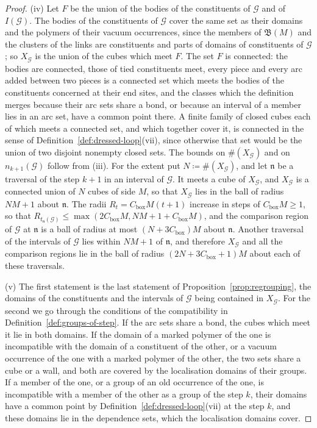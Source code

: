 \documentclass[11pt]{preprint}
\numberwithin{equation}{section}
\theoremstyle{definition}
\theoremstyle{remark}
\theoremstyle{plain}
\begin{document}
\begin{proof}
(iv) Let $F$ be the union of the bodies of the constituents of $\mathcal G$ and of $I(\mathcal G)$. The bodies of the constituents of $\mathcal G$ cover the same set as their domains and the polymers of their vacuum occurrences, since the members of $\mathfrak B(M)$ and the clusters of the links are constituents and parts of domains of constituents of $\mathcal G$; so $X_{\mathcal G}$ is the union of the cubes which meet $F$. The set $F$ is connected: the bodies are connected, those of tied constituents meet, every piece and every arc added between two pieces is a connected set which meets the bodies of the constituents concerned at their end sites, and the classes which the definition merges because their arc sets share a bond, or because an interval of a member lies in an arc set, have a common point there. A finite family of closed cubes each of which meets a connected set, and which together cover it, is connected in the sense of Definition~\ref{def:dressed-loop}(vii), since otherwise that set would be the union of two disjoint nonempty closed sets. The bounds on $\#(X_{\mathcal G})$ and on $n_{k+1}(\mathcal G)$ follow from (iii). For the extent put $N \coloneqq \#(X_{\mathcal G})$, and let $\mathfrak n$ be a traversal of the step $k + 1$ in an interval of $\mathcal G$. It meets a cube of $X_{\mathcal G}$, and $X_{\mathcal G}$ is a connected union of $N$ cubes of side $M$, so that $X_{\mathcal G}$ lies in the ball of radius $NM + 1$ about $\mathfrak n$. The radii $R_t = C_{\mathrm{box}}M(t + 1)$ increase in steps of $C_{\mathrm{box}}M \geq 1$, so that $R_{t_{\mathfrak n}(\mathcal G)} \leq \max(2C_{\mathrm{box}}M, NM + 1 + C_{\mathrm{box}}M)$, and the comparison region of $\mathcal G$ at $\mathfrak n$ is a ball of radius at most $(N + 3C_{\mathrm{box}})M$ about $\mathfrak n$. Another traversal of the intervals of $\mathcal G$ lies within $NM + 1$ of $\mathfrak n$, and therefore $X_{\mathcal G}$ and all the comparison regions lie in the ball of radius $(2N + 3C_{\mathrm{box}} + 1)M$ about each of these traversals.

(v) The first statement is the last statement of Proposition~\ref{prop:regrouping}, the domains of the constituents and the intervals of $\mathcal G$ being contained in $X_{\mathcal G}$. For the second we go through the conditions of the compatibility in Definition~\ref{def:groups-of-step}. If the arc sets share a bond, the cubes which meet it lie in both domains. If the domain of a marked polymer of the one is incompatible with the domain of a constituent of the other, or a vacuum occurrence of the one with a marked polymer of the other, the two sets share a cube or a wall, and both are covered by the localisation domains of their groups. If a member of the one, or a group of an old occurrence of the one, is incompatible with a member of the other as a group of the step $k$, their domains have a common point by Definition~\ref{def:dressed-loop}(vii) at the step $k$, and these domains lie in the dependence sets, which the localisation domains cover.
\end{proof}
\end{document}

